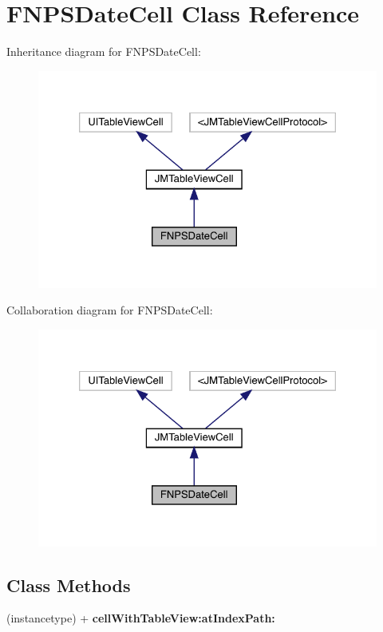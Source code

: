 \hypertarget{interface_f_n_p_s_date_cell}{}\section{F\+N\+P\+S\+Date\+Cell Class Reference}
\label{interface_f_n_p_s_date_cell}


Inheritance diagram for F\+N\+P\+S\+Date\+Cell\+:\nopagebreak
\begin{figure}[H]
\begin{center}
\leavevmode
\includegraphics[width=326pt]{interface_f_n_p_s_date_cell__inherit__graph}
\end{center}
\end{figure}


Collaboration diagram for F\+N\+P\+S\+Date\+Cell\+:\nopagebreak
\begin{figure}[H]
\begin{center}
\leavevmode
\includegraphics[width=326pt]{interface_f_n_p_s_date_cell__coll__graph}
\end{center}
\end{figure}
\subsection*{Class Methods}
\begin{DoxyCompactItemize}
\item 
\mbox{\label{interface_f_n_p_s_date_cell_a00a5156aad1ee4bb424c0ac27e313671}} 
(instancetype) + {\bfseries cell\+With\+Table\+View\+:at\+Index\+Path\+:}
\end{DoxyCompactItemize}
